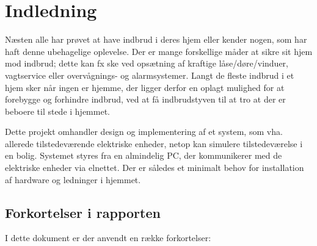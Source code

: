 \chapter{Indledning}

Næsten alle har prøvet at have indbrud i deres hjem eller kender nogen, som har haft denne ubehagelige oplevelse. 
Der er mange forskellige måder at sikre sit hjem mod indbrud; dette kan fx ske ved opsætning af kraftige låse/døre/vinduer, vagtservice eller overvågnings- og alarmsystemer. 
Langt de fleste indbrud i et hjem sker når ingen er hjemme, der ligger derfor en oplagt mulighed for at forebygge og forhindre indbrud, ved at få indbrudstyven til at tro at der er beboere til stede i hjemmet. 

Dette projekt omhandler design og implementering af et system, som vha. allerede tilstedeværende elektriske enheder, netop kan simulere tilstedeværelse i en bolig. 
Systemet styres fra en almindelig PC, der kommunikerer med de elektriske enheder via elnettet. 
Der er således et minimalt behov for installation af hardware og ledninger i hjemmet. 

\section{Forkortelser i rapporten}
I dette dokument er der anvendt en række forkortelser:

